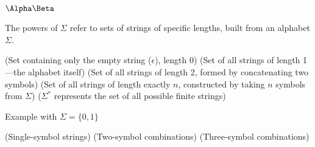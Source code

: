 $\Alpha\Beta$

\begin{NxSSSSBox}
	\begin{NxIDBox}
		The powers of $\Sigma$ refer to sets of strings of specific lengths, built from an alphabet $\Sigma$.
		\begin{NxListDark}
			 (Set containing only the empty string ($\epsilon$), length 0)
			 (Set of all strings of length 1—the alphabet itself)
			 (Set of all strings of length 2, formed by concatenating two symbols)
			 (Set of all strings of length exactly $n$, constructed by taking $n$ symbols from $\Sigma$)
			 ($\Sigma^*$ represents the set of all possible finite strings)
		\end{NxListDark}
	\end{NxIDBox}
	\begin{NxIDBox}
		Example with $\Sigma = \{0,1\}$
		\begin{NxListDark}
			 (Single-symbol strings)
			 (Two-symbol combinations)
			 (Three-symbol combinations)
		\end{NxListDark}
	\end{NxIDBox}
\end{NxSSSSBox}

